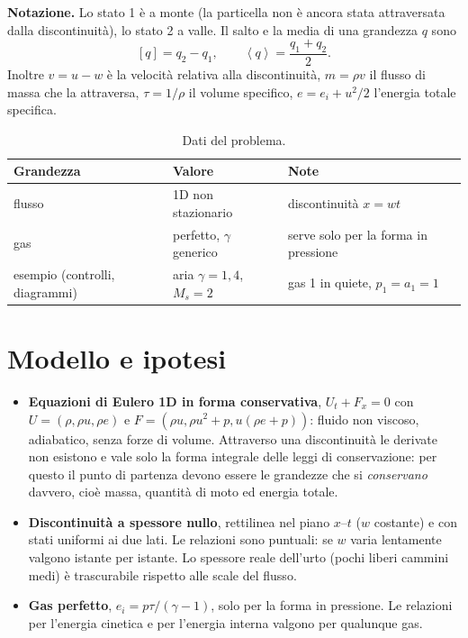 \documentclass[11pt,a4paper]{article}
\newcommand{\jp}[1]{\left[#1\right]}            %
\newcommand{\av}[1]{\left\langle #1\right\rangle} %
\begin{document}
\textbf{Notazione.} Lo stato 1 è a monte (la particella non è ancora stata attraversata dalla discontinuità), lo
stato 2 a valle. Il salto e la media di una grandezza $q$ sono
\[
  \jp{q}=q_2-q_1,\qquad \av{q}=\frac{q_1+q_2}{2}.
\]
Inoltre $v=u-w$ è la velocità relativa alla discontinuità, $m=\rho v$ il flusso di massa che la attraversa,
$\tau=1/\rho$ il volume specifico, $e=e_i+u^2/2$ l'energia totale specifica.

\begin{table}[H]
  \centering
  \begin{tabular}{lll}
    \toprule
    Grandezza & Valore & Note \\
    \midrule
    flusso & 1D non stazionario & discontinuità $x=wt$ \\
    gas & perfetto, $\gamma$ generico & serve solo per la forma in pressione \\
    esempio (controlli, diagrammi) & aria $\gamma=1{,}4$, $M_s=2$ & gas 1 in quiete, $p_1=a_1=1$ \\
    \bottomrule
  \end{tabular}
  \caption{Dati del problema.}
\end{table}

\section{Modello e ipotesi}
\begin{itemize}
  \item \textbf{Equazioni di Eulero 1D in forma conservativa}, $U_t+F_x=0$ con $U=(\rho,\rho u,\rho e)$ e
        $F=(\rho u,\rho u^2+p,u(\rho e+p))$: fluido non viscoso, adiabatico, senza forze di volume. Attraverso una
        discontinuità le derivate non esistono e vale solo la forma integrale delle leggi di conservazione:
        per questo il punto di partenza devono essere le grandezze che si \emph{conservano} davvero, cioè massa,
        quantità di moto ed energia totale.
  \item \textbf{Discontinuità a spessore nullo}, rettilinea nel piano $x$--$t$ ($w$ costante) e con stati
        uniformi ai due lati. Le relazioni sono puntuali: se $w$ varia lentamente valgono istante per istante.
        Lo spessore reale dell'urto (pochi liberi cammini medi) è trascurabile rispetto alle scale del flusso.
  \item \textbf{Gas perfetto}, $e_i=p\tau/(\gamma-1)$, solo per la forma in pressione. Le relazioni per
        l'energia cinetica e per l'energia interna valgono per qualunque gas.
\end{itemize}
\end{document}
